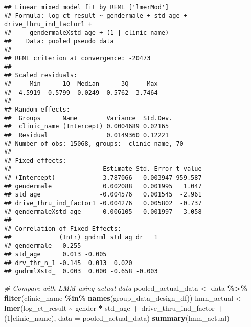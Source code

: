 \documentclass[
]{article}
\newenvironment{Shaded}{\begin{snugshade}}{\end{snugshade}}
\newcommand{\AttributeTok}[1]{\textcolor[rgb]{0.13,0.29,0.53}{#1}}
\newcommand{\CommentTok}[1]{\textcolor[rgb]{0.56,0.35,0.01}{\textit{#1}}}
\newcommand{\DecValTok}[1]{\textcolor[rgb]{0.00,0.00,0.81}{#1}}
\newcommand{\FunctionTok}[1]{\textcolor[rgb]{0.13,0.29,0.53}{\textbf{#1}}}
\newcommand{\NormalTok}[1]{#1}
\newcommand{\OtherTok}[1]{\textcolor[rgb]{0.56,0.35,0.01}{#1}}
\newcommand{\SpecialCharTok}[1]{\textcolor[rgb]{0.81,0.36,0.00}{\textbf{#1}}}
\begin{document}
\begin{verbatim}
## Linear mixed model fit by REML ['lmerMod']
## Formula: log_ct_result ~ gendermale + std_age + drive_thru_ind_factor1 +  
##     gendermaleXstd_age + (1 | clinic_name)
##    Data: pooled_pseudo_data
## 
## REML criterion at convergence: -20473
## 
## Scaled residuals: 
##     Min      1Q  Median      3Q     Max 
## -4.5919 -0.5799  0.0249  0.5762  3.7464 
## 
## Random effects:
##  Groups      Name        Variance  Std.Dev.
##  clinic_name (Intercept) 0.0004689 0.02165 
##  Residual                0.0149360 0.12221 
## Number of obs: 15068, groups:  clinic_name, 70
## 
## Fixed effects:
##                         Estimate Std. Error t value
## (Intercept)             3.787066   0.003947 959.587
## gendermale              0.002088   0.001995   1.047
## std_age                -0.004576   0.001545  -2.961
## drive_thru_ind_factor1 -0.004276   0.005802  -0.737
## gendermaleXstd_age     -0.006105   0.001997  -3.058
## 
## Correlation of Fixed Effects:
##             (Intr) gndrml std_ag dr___1
## gendermale  -0.255                     
## std_age      0.013 -0.005              
## drv_thr_n_1 -0.145  0.013  0.020       
## gndrmlXstd_  0.003  0.000 -0.658 -0.003
\end{verbatim}

\begin{Shaded}
\begin{Highlighting}[]
\CommentTok{\# Compare with LMM using actual data}
\NormalTok{pooled\_actual\_data }\OtherTok{\textless{}{-}}\NormalTok{ data }\SpecialCharTok{\%\textgreater{}\%} \FunctionTok{filter}\NormalTok{(clinic\_name }\SpecialCharTok{\%in\%} \FunctionTok{names}\NormalTok{(group\_data\_design\_df))}
\NormalTok{lmm\_actual }\OtherTok{\textless{}{-}} \FunctionTok{lmer}\NormalTok{(log\_ct\_result }\SpecialCharTok{\textasciitilde{}}\NormalTok{ gender }\SpecialCharTok{*}\NormalTok{ std\_age }\SpecialCharTok{+}\NormalTok{ drive\_thru\_ind\_factor }\SpecialCharTok{+}\NormalTok{ (}\DecValTok{1}\SpecialCharTok{|}\NormalTok{clinic\_name), }\AttributeTok{data =}\NormalTok{ pooled\_actual\_data)}
\FunctionTok{summary}\NormalTok{(lmm\_actual)}
\end{Highlighting}
\end{Shaded}
\end{document}
